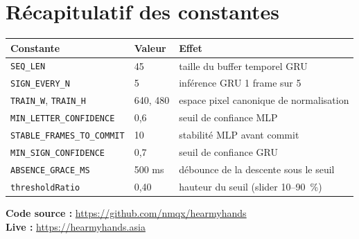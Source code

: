 \documentclass[11pt,a4paper]{article}
\begin{document}
\section{R\'ecapitulatif des constantes}

\begin{center}
\renewcommand{\arraystretch}{1.2}
\begin{tabular}{lll}
\hline
\textbf{Constante} & \textbf{Valeur} & \textbf{Effet} \\
\hline
\texttt{SEQ\_LEN}                 & 45    & taille du buffer temporel GRU \\
\texttt{SIGN\_EVERY\_N}           & 5     & inf\'erence GRU 1 frame sur 5 \\
\texttt{TRAIN\_W}, \texttt{TRAIN\_H} & 640, 480 & espace pixel canonique de normalisation \\
\texttt{MIN\_LETTER\_CONFIDENCE}  & 0{,}6 & seuil de confiance MLP \\
\texttt{STABLE\_FRAMES\_TO\_COMMIT}& 10   & stabilit\'e MLP avant commit \\
\texttt{MIN\_SIGN\_CONFIDENCE}    & 0{,}7 & seuil de confiance GRU \\
\texttt{ABSENCE\_GRACE\_MS}       & 500 ms & d\'ebounce de la descente sous le seuil \\
\texttt{thresholdRatio}           & 0{,}40 & hauteur du seuil (slider 10--90~\%) \\
\hline
\end{tabular}
\end{center}

\vspace{0.6em}
\noindent\textbf{Code source :} \url{https://github.com/nmqx/hearmyhands}\\
\textbf{Live :} \url{https://hearmyhands.asia}
\end{document}
